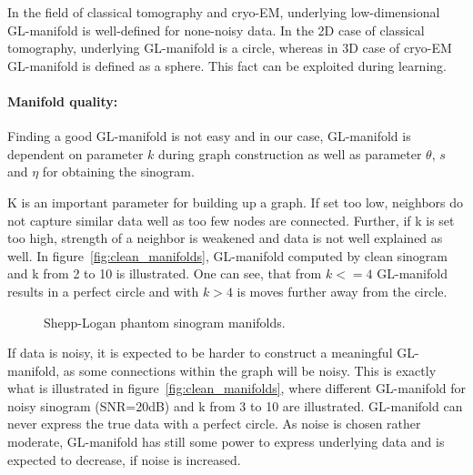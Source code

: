 \begin{tcolorbox}[colback=red!5!white,colframe=red!75!black]
    In the field of classical tomography and cryo-EM, underlying low-dimensional GL-manifold is well-defined for none-noisy data.
    In the 2D case of classical tomography, underlying GL-manifold is a circle, whereas in 3D case of cryo-EM  GL-manifold
    is defined as a sphere.
    This fact can be exploited during learning.
\end{tcolorbox}

\paragraph{Manifold quality:}

Finding a good GL-manifold is not easy and in our case, GL-manifold is dependent on parameter $k$ during graph construction
as well as parameter $\theta$, $s$ and $\eta$ for obtaining the sinogram.

K is an important parameter for building up a graph. If set too low, neighbors
do not capture similar data well as too few nodes are connected. 
Further, if k is set too high, strength of a neighbor 
is weakened and data is not well explained as well.
In figure~\ref{fig:clean_manifolds}, GL-manifold computed by clean sinogram and k from 2 to 10 is illustrated.
One can see, that from $k <= 4$ GL-manifold results in a perfect circle and with $k >  4$ is moves 
further away from the circle. 


\begin{figure}[H]
    \centering
    \caption{Shepp-Logan phantom sinogram manifolds.}
\end{figure}

If data is noisy, it is expected to be harder to construct a meaningful GL-manifold, as some connections within
the graph will be noisy. This is exactly what is illustrated in figure~\ref{fig:clean_manifolds}, where 
different GL-manifold for noisy sinogram (SNR=20dB) and k from 3 to 10 are illustrated.
GL-manifold can never express the true data with a perfect circle. As noise is chosen rather moderate, GL-manifold has still some 
power to express underlying data and is expected to decrease, if noise is increased.


